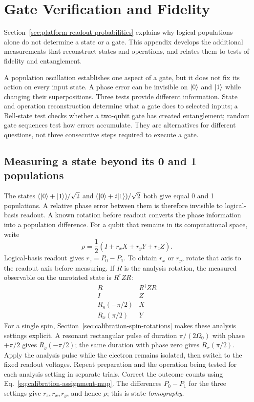 \FloatBarrier
\section{Gate Verification and Fidelity}
\label{app:gate-verification}

\label{sec:verification-benchmarking}

Section~\ref{sec:platform-readout-probabilities} explains why logical
populations alone do not determine a state or a gate. This appendix
develops the additional measurements that reconstruct states and
operations, and relates them to tests of fidelity and entanglement.

A population oscillation establishes one aspect of a gate, but it
does not fix its action on every input state. A phase error can be
invisible on $\lvert 0\rangle$ and $\lvert 1\rangle$ while changing their superpositions.
Three tests provide different information. State and operation
reconstruction determine what a gate does to selected inputs;
a Bell-state test checks whether a two-qubit gate has created
entanglement; random gate sequences test how errors accumulate.
They are alternatives for different questions, not three consecutive
steps required to execute a gate.

\subsection{Measuring a state beyond its 0 and 1 populations}
\label{sec:calibration-state-tomography}

The states $(\lvert 0\rangle+\lvert 1\rangle)/\sqrt2$ and
$(\lvert 0\rangle+i\lvert 1\rangle)/\sqrt2$ both give equal 0 and 1 populations.
A relative phase error between them is therefore invisible to
logical-basis readout. A known rotation before readout converts
the phase information into a population difference.
For a qubit that remains in its computational space, write
\begin{equation}
 \rho=\frac12(I+r_xX+r_yY+r_zZ).
 \label{eq:calibration-bloch-state}
\end{equation}
Logical-basis readout gives
$r_z=P_0-P_1$. To obtain $r_x$ or $r_y$, rotate that axis to the
readout axis before measuring. If $R$ is the analysis rotation,
the measured observable on the unrotated state is $R^\dagger ZR$:
\[
 \begin{array}{c|c}
 R & R^\dagger ZR\\ \hline
 I & Z\\
 R_y(-\pi/2)&X\\
 R_x(\pi/2)&Y
 \end{array}
\]
For a single spin, Section~\ref{sec:calibration-spin-rotations}
makes these analysis settings explicit. A resonant rectangular pulse of
duration $\pi/(2\Omega_0)$ with phase $+\pi/2$ gives $R_y(-\pi/2)$;
the same duration with phase zero gives $R_x(\pi/2)$.
Apply the analysis pulse while the electron remains isolated,
then switch to the fixed readout voltages.
Repeat preparation and the operation being tested for each
analysis setting in separate trials. Correct the outcome counts
using Eq.~\eqref{eq:calibration-assignment-map}.
The differences $P_0-P_1$ for the three settings give
$r_z,r_x,r_y$, and hence $\rho$; this is state \emph{tomography}.

